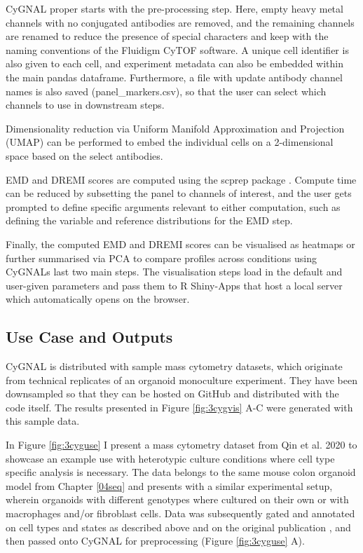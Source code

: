 CyGNAL proper starts with the pre-processing step. Here, empty heavy metal channels with no conjugated antibodies are removed, and the remaining channels are renamed to reduce the presence of special characters and keep with the naming conventions of the Fluidigm CyTOF software. A unique cell identifier is also given to each cell, and experiment metadata can also be embedded within the main pandas dataframe. Furthermore, a file with update antibody channel names is also saved (panel\_markers.csv), so that the user can select which channels to use in downstream steps.

Dimensionality reduction via Uniform Manifold Approximation and Projection (UMAP)\cite{mcinnes_umap_2020} can be performed to embed the individual cells on a 2-dimensional space based on the select antibodies.

EMD and DREMI scores are computed using the scprep package \cite{noauthor_krishnaswamylabscprep_2021}. Compute time can be reduced by subsetting the panel to channels of interest, and the user gets prompted to define specific arguments relevant to either computation, such as defining the variable and reference distributions for the EMD step.

Finally, the computed EMD and DREMI scores can be visualised as heatmaps or further summarised via PCA to compare profiles across conditions using CyGNALs last two main steps. The visualisation steps load in the default and user-given parameters and pass them to R Shiny-Apps \cite{noauthor_rstudioshiny_2021} that host a local server which automatically opens on the browser.

\subsection{Use Case and Outputs}

CyGNAL is distributed with sample mass cytometry datasets, which originate from technical replicates of an organoid monoculture experiment. They have been downsampled so that they can be hosted on GitHub and distributed with the code itself. The results presented in Figure \ref{fig:3cygvis} A-C were generated with this sample data.

In Figure \ref{fig:3cyguse} I present a mass cytometry dataset from Qin et al. 2020 \cite{qin_cell-type-specific_2020} to showcase an example use with heterotypic culture conditions where cell type specific analysis is necessary. The data belongs to the same mouse colon organoid model from Chapter \ref{04seq} and presents with a similar experimental setup, wherein organoids with different genotypes where cultured on their own or with macrophages and/or fibroblast cells. Data was subsequently gated and annotated on cell types and states as described above and on the original publication \cite{qin_cell-type-specific_2020}, and then passed onto CyGNAL for preprocessing (Figure \ref{fig:3cyguse} A).

